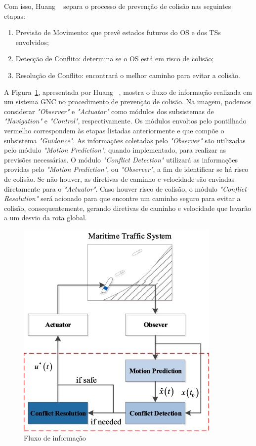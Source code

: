         Com isso, Huang \etal~\cite{HUANG2020451} separa o processo de prevenção de colisão nas seguintes etapas: 
        
        \begin{enumerate}
            \item Previsão de Movimento: que prevê estados futuros do OS e dos TSs envolvidos;
            \item Detecção de Conflito: determina se o OS está em risco de colisão;
            \item Resolução de Conflito: encontrará o melhor caminho para evitar a colisão.
        \end{enumerate}
        
        A Figura~\ref{fig:Huang2020_collisionAvoidanceProcess}, apresentada por Huang \etal~\cite{HUANG2020451}, mostra o fluxo de informação realizada em um sistema GNC no procedimento de prevenção de colisão. Na imagem, podemos considerar \textit{"Observer"} e \textit{"Actuator"} como módulos dos subsistemas de \textit{"Navigation"} e \textit{"Control"}, respectivamente. Os módulos envoltos pelo pontilhado vermelho correspondem às etapas listadas anteriormente e que compõe o subsistema \textit{"Guidance"}. As informações coletadas pelo \textit{"Observer"} são utilizadas pelo módulo \textit{"Motion Prediction"}, quando implementado, para realizar as previsões necessárias. O módulo \textit{"Conflict Detection"} utilizará as informações providas pelo \textit{"Motion Prediction"}, ou \textit{"Observer"}, a fim de identificar se há risco de colisão. Se não houver, as diretivas de caminho e velocidade são enviadas diretamente para o \textit{"Actuator"}. Caso houver risco de colisão, o módulo \textit{"Conflict Resolution"} será acionado para que encontre um caminho seguro para evitar a colisão, consequentemente, gerando diretivas de caminho e velocidade que levarão a um desvio da rota global.
        
        \begin{figure}[H]
            \centering
            \includegraphics{fig/chap2/information_flow.png}
            \caption{Fluxo de informação ~\cite{HUANG2020451}}
            \label{fig:Huang2020_collisionAvoidanceProcess}
        \end{figure}
        
